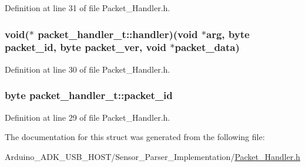 Definition at line 31 of file Packet\-\_\-\-Handler.\-h.

\hypertarget{structpacket__handler__t_a0e7868fbcc975c2bc313652986091b1c}{
\subsubsection[{handler}]{\setlength{\rightskip}{0pt plus 5cm}void($\ast$  packet\-\_\-handler\-\_\-t\-::handler)(void $\ast$arg, byte {\bf packet\-\_\-id}, byte packet\-\_\-ver, void $\ast$packet\-\_\-data)}}\label{structpacket__handler__t_a0e7868fbcc975c2bc313652986091b1c}


Definition at line 30 of file Packet\-\_\-\-Handler.\-h.

\hypertarget{structpacket__handler__t_a10a32700326ae2f81e895e7fdc82f275}{
\subsubsection[{packet\-\_\-id}]{\setlength{\rightskip}{0pt plus 5cm}byte packet\-\_\-handler\-\_\-t\-::packet\-\_\-id}}\label{structpacket__handler__t_a10a32700326ae2f81e895e7fdc82f275}


Definition at line 29 of file Packet\-\_\-\-Handler.\-h.



The documentation for this struct was generated from the following file\-:\begin{DoxyCompactItemize}
\item 
Arduino\-\_\-\-A\-D\-K\-\_\-\-U\-S\-B\-\_\-\-H\-O\-S\-T/\-Sensor\-\_\-\-Parser\-\_\-\-Implementation/\hyperlink{_packet___handler_8h}{Packet\-\_\-\-Handler.\-h}\end{DoxyCompactItemize}
